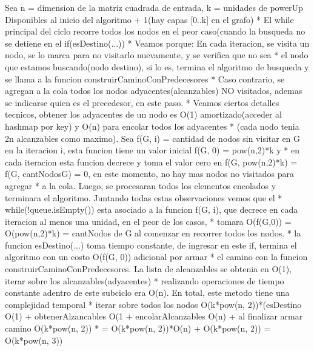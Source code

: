 Sea n = {dimension de la matriz cuadrada de entrada}, k = unidades de powerUp Disponibles al inicio del algoritmo + 1(hay capas [0..k] en el grafo)
 *			El while principal del ciclo recorre todos los nodos en el peor caso(cuando la busqueda no se detiene en el if(esDestino(...))
 *			Veamos porque: En cada iteracion, se visita un nodo, se lo marca para no visitarlo nuevamente, y se verifica que no sea
 *			el nodo que estamos buscando(nodo destino), si lo es, termina el algoritmo de busqueda y se llama a la funcion construirCaminoConPredecesores
 *			Caso contrario, se agregan a la cola todos los nodos adyacentes(alcanzables) NO visitados, ademas se indicarse quien es el precedesor, en este paso.
 *			Veamos ciertos detalles tecnicos, obtener los adyacentes de un nodo es O(1) amortizado(acceder al hashmap por key) y O(n) para encolar todos los adyacentes
 *			(cada nodo tenia 2n alcanzables como maximo). Sea f(G, i) = {cantidad de nodos sin visitar en G en la iteracion i}, esta funcion tiene un valor inicial f(G, 0) = pow(n,2)*k y
 *			en cada iteracion esta funcion decrece y toma el valor cero en f(G, pow(n,2)*k) = f(G, cantNodosG) = 0, en este momento, no hay mas nodos no visitados para agregar 
 *			a la cola. Luego, se procesaran todos los elementos encolados y terminara el algoritmo. Juntando todas estas observaciones vemos que el 
 *			while(!queue.isEmpty()) esta asociado a la funcion f(G, i), que decrece en cada iteracion al menos una unidad, en el peor de los casos, 
 *			tomara O(f(G,0)) = O(pow(n,2)*k) = {cantNodos de G al comenzar} en recorrer todos los nodos.
 *			la funcion esDestino(...) toma tiempo constante, de ingresar en este if, termina el algoritmo con un costo O(f(G, 0)) adicional por armar
 *			el camino con la funcion construirCaminoConPredecesores. La lista de alcanzables se obtenia en O(1), iterar sobre los alcanzables(adyacentes)
 *			realizando operaciones de tiempo constante adentro de este subciclo	era O(n). En total, este metodo tiene una complejidad temporal
 *			{iterar sobre todos los nodos O(k*pow(n, 2))}*({esDestino O(1)} + {obtenerAlzancables O(1} + {encolarAlcanzables O(n}) + {al finalizar armar camino O(k*pow(n, 2))}
 *			= O(k*pow(n, 2))*O(n) + O(k*pow(n, 2)) = O(k*pow(n, 3)) 


